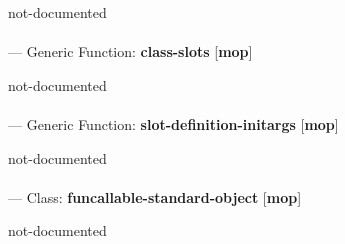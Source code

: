 \begin{adjustwidth}{5em}{5em}
not-documented
\end{adjustwidth}

\paragraph{}
\label{MOP:CLASS-SLOTS}
--- Generic Function: \textbf{class-slots} [\textbf{mop}] \textit{}

\begin{adjustwidth}{5em}{5em}
not-documented
\end{adjustwidth}

\paragraph{}
\label{MOP:SLOT-DEFINITION-INITARGS}
--- Generic Function: \textbf{slot-definition-initargs} [\textbf{mop}] \textit{}

\begin{adjustwidth}{5em}{5em}
not-documented
\end{adjustwidth}

\paragraph{}
\label{MOP:FUNCALLABLE-STANDARD-OBJECT}
--- Class: \textbf{funcallable-standard-object} [\textbf{mop}] \textit{}

\begin{adjustwidth}{5em}{5em}
not-documented
\end{adjustwidth}

